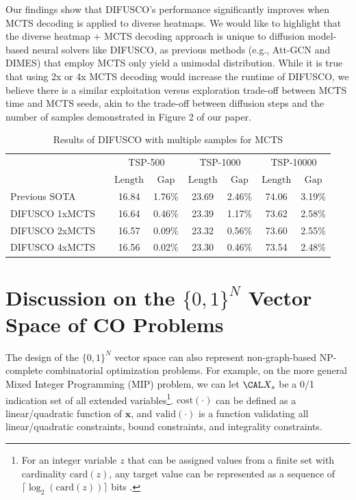 Our findings show that DIFUSCO's performance significantly improves when MCTS decoding is applied to diverse heatmaps. We would like to highlight that the diverse heatmap + MCTS decoding approach is unique to diffusion model-based neural solvers like DIFUSCO, as previous methods (e.g., Att-GCN and DIMES) that employ MCTS only yield a unimodal distribution. While it is true that using 2x or 4x MCTS decoding would increase the runtime of DIFUSCO, we believe there is a similar exploitation versus exploration trade-off between MCTS time and MCTS seeds, akin to the trade-off between diffusion steps and the number of samples demonstrated in Figure 2 of our paper.

\begin{table}[t]
\centering
\small
\caption{Results of DIFUSCO with multiple samples for MCTS}
\begin{sc}
\begin{tabular}{lccccccc}
\toprule
& & \multicolumn{2}{c}{TSP-500} & \multicolumn{2}{c}{TSP-1000} & \multicolumn{2}{c}{TSP-10000} \\ 
& & $\mathrm{Length}$ & $\mathrm{Gap}$ & $\mathrm{Length}$ & $\mathrm{Gap}$ & $\mathrm{Length}$ & $\mathrm{Gap}$ \\ 
\midrule
Previous SOTA & & 16.84 & 1.76\% & 23.69 & 2.46\% & 74.06 & 3.19\% \\
DIFUSCO 1xMCTS & & 16.64 & 0.46\% & 23.39 & 1.17\% & 73.62 & 2.58\% \\
DIFUSCO 2xMCTS & & 16.57 & 0.09\% & 23.32 & 0.56\% & 73.60 & 2.55\% \\
DIFUSCO 4xMCTS & & 16.56 & 0.02\% & 23.30 & 0.46\% & 73.54 & 2.48\% \\
\bottomrule
\end{tabular}
\end{sc}
\label{tab:mcts_samples}
\end{table}


\section{Discussion on the $\{0, 1\}^N$ Vector Space of CO Problems} \label{sec:mip}

The design of the $\{0, 1\}^N$ vector space can also represent non-graph-based NP-complete combinatorial optimization problems.
For example, on the more general Mixed Integer Programming (MIP) problem, we can let $\CAL X_s$ be a 0/1 indication set of all extended variables\footnote{For an integer variable $z$ that can be assigned values from a finite set with cardinality $\mathrm{card}(z)$, any target value can be represented as a sequence of $\lceil \log_2(\mathrm{card}(z)) \rceil$ bits \citep{nair2020solving,chen2022analog}.}. $\mathrm{cost}(\cdot)$ can be defined as a linear/quadratic function of $\mathbf{x}$, and $\mathrm{valid}(\cdot)$ is a function validating all linear/quadratic constraints, bound constraints, and integrality constraints.

